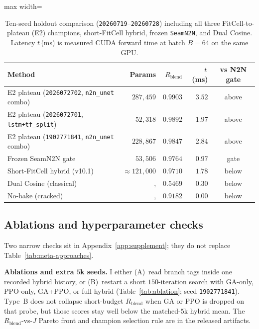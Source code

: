 \begin{table}[t]
  \centering
  \caption{Ten-seed holdout comparison (\texttt{20260719}--\texttt{20260728}) including all three FitCell-to-plateau (E2) champions, short-FitCell hybrid, frozen \texttt{SeamN2N}, and Dual Cosine.
  Latency $t$\,(ms) is measured CUDA forward time at batch $B{=}64$ on the same GPU.}
  \label{tab:v14-hybrid-converge}
  \setlength{\tabcolsep}{3pt}
  \footnotesize
  \begin{adjustbox}{max width=\columnwidth}
  \begin{tabular}{@{}lrrrc@{}}
    \toprule
    Method & Params & $R_{\mathrm{blend}}$ & $t$\,(ms) & vs N2N gate \\
    \midrule
    E2 plateau (\texttt{2026072702}, \texttt{n2n\_unet} combo) & $287{,}459$ & $0.9903$ & $3.52$ & above \\
    E2 plateau (\texttt{2026072701}, \texttt{lstm+tf\_split}) & $52{,}318$ & $0.9892$ & $1.97$ & above \\
    E2 plateau (\texttt{1902771841}, \texttt{n2n\_unet} combo) & $228{,}867$ & $0.9847$ & $2.84$ & above \\
    Frozen SeamN2N gate & $53{,}506$ & $0.9764$ & $0.97$ & gate \\
    Short-FitCell hybrid (v10.1) & ${\approx}121{,}000$ & $0.9710$ & $1.78$ & below \\
    Dual Cosine (classical) &, & $0.5469$ & $0.30$ & below \\
    No-bake (cracked) &, & $0.9182$ & $0.00$ & below \\
    \bottomrule
  \end{tabular}
  \end{adjustbox}
\end{table}

\subsection{Ablations and hyperparameter checks}
\label{sec:ablation-def}
\label{sec:ablation-hp-main}

Two narrow checks sit in Appendix~\ref{app:supplement}; they do not replace Table~\ref{tab:meta-approaches}.

\textbf{Ablations and extra $5$k seeds.}
I either (A)~read branch tags inside one recorded hybrid history, or
(B)~restart a short $150$-iteration search with GA-only, PPO-only, GA+PPO, or full hybrid
(Table~\ref{tab:ablation}; seed \texttt{1902771841}).
Type~B does not collapse short-budget $R_{\mathrm{blend}}$ when GA or PPO is dropped on that probe,
but those scores stay well below the matched-$5$k hybrid mean.
The $R_{\mathrm{blend}}$-vs-$J$ Pareto front and champion selection rule are in the released artifacts.

